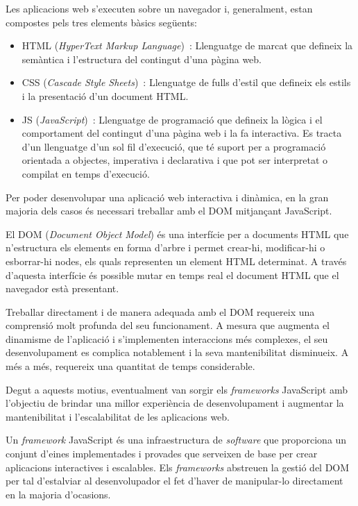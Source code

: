 \documentclass[a4paper,12pt]{ThesisStyle}
\begin{document}
Les aplicacions web s'executen sobre un navegador i, generalment, estan compostes pels tres elements bàsics següents:
\begin{itemize}
  \item HTML (\textit{HyperText Markup Language})~\cite{HTML}: Llenguatge de marcat que defineix la semàntica i l'estructura del contingut d'una pàgina web.
  \item CSS (\textit{Cascade Style Sheets})~\cite{CSS}: Llenguatge de fulls d'estil que defineix els estils i la presentació d'un document HTML.
  \item JS (\textit{JavaScript})~\cite{JS}: Llenguatge de programació que defineix la lògica i el comportament del contingut d'una pàgina web i la fa interactiva. Es tracta d'un llenguatge d'un sol fil d'execució, que té suport per a programació orientada a objectes, imperativa i declarativa i que pot ser interpretat o compilat en temps d'execució.
\end{itemize}

Per poder desenvolupar una aplicació web interactiva i dinàmica, en la gran majoria dels casos és necessari treballar amb el DOM mitjançant JavaScript.

El DOM (\textit{Document Object Model}) és una interfície per a documents HTML que n'estructura els elements en forma d'arbre i permet crear-hi, modificar-hi o esborrar-hi nodes, els quals representen un element HTML determinat. A través d'aquesta interfície és possible mutar en temps real el document HTML que el navegador està presentant.

Treballar directament i de manera adequada amb el DOM requereix una comprensió molt profunda del seu funcionament. A mesura que augmenta el dinamisme de l'aplicació i s'implementen interaccions més complexes, el seu desenvolupament es complica notablement i la seva mantenibilitat disminueix. A més a més, requereix una quantitat de temps considerable.

Degut a aquests motius, eventualment van sorgir els \textit{frameworks} JavaScript amb l'objectiu de brindar una millor experiència de desenvolupament i augmentar la mantenibilitat i l'escalabilitat de les aplicacions web.

Un \textit{framework} JavaScript és una infraestructura de \textit{software} que proporciona un conjunt d'eines implementades i provades que serveixen de base per crear aplicacions interactives i escalables. Els \textit{frameworks} abstreuen la gestió del DOM per tal d'estalviar al desenvolupador el fet d'haver de manipular-lo directament en la majoria d'ocasions.
\end{document}
